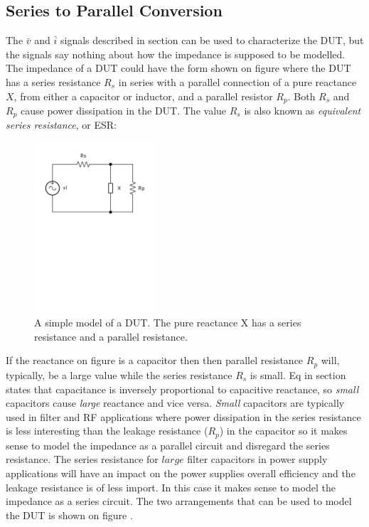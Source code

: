 \subsection{Series to Parallel Conversion} \label{subsec:SeriesToParallel}
The $\bar v$ and $\bar i$ signals described in section  can be used to characterize the DUT, but the signals say nothing about how the impedance is supposed to be modelled. The impedance of a DUT could have the form shown on figure  where the DUT has a series resistance $R_s$ in series with a parallel connection of a pure reactance $X$, from either a capacitor or inductor, and a parallel resistor $R_p$. Both $R_s$ and $R_p$ cause power dissipation in the DUT. The value $R_s$ is also known as \textit{equivalent series resistance}, or ESR:

\begin{figure}[H]
    \centering
    \includegraphics[clip, trim=0 450 0 0, width=0.4\textwidth]{Sections/4_TechnicalAnalysis/Figures/4_1_1_DUTXSeriesParallel.pdf}
    \caption{A simple model of a DUT. The pure reactance X has a series resistance and a parallel resistance.}
    \label{fig:4_1_5_DUTXSeriesParallel}
\end{figure}

If the reactance on figure  is a capacitor then then parallel resistance $R_p$ will, typically, be a large value while the series resistance $R_s$ is small. Eq  in section  states that capacitance is inversely proportional to capacitive reactance, so \textit{small} capacitors cause \textit{large} reactance and vice versa. \textit{Small} capacitors are typically used in filter and RF applications where power dissipation in the series resistance is less interesting than the leakage resistance ($R_p$) in the capacitor so it makes sense to model the impedance as a parallel circuit and disregard the series resistance. The series resistance for $large$ filter capacitors in power supply applications will have an impact on the power supplies overall efficiency and the leakage resistance is of less import. In this case it makes sense to model the impedance as a series circuit. The two arrangements that can be used to model the DUT is shown on figure .

